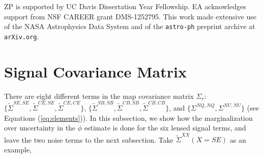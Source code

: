 \documentclass[iop,apj, numberedappendix]{emulateapj}
\begin{document}
\acknowledgements
ZP is supported by UC Davis Dissertation Year Fellowship.
EA acknowledges support from NSF CAREER grant DMS-1252795.
This work made extensive use of the NASA Astrophysics Data System and
of the {\tt astro-ph} preprint archive at {\tt arXiv.org}.




\appendix
\section{Signal Covariance Matrix}
\label{sec:app1}

There are eight different terms in the map covariance matrix $\Sigma_r$:
$\{ \tilde\Sigma^{SE,SE},\tilde\Sigma^{CE,SE},\tilde\Sigma^{CE,CE} \}$,
$\{ \tilde\Sigma^{SB,SB},\tilde\Sigma^{CB,SB},\tilde\Sigma^{CB,CB} \}$,
and $\{ \Sigma^{NQ,NQ},\Sigma^{NU,NU} \}$ (see Equations (\ref{eq:elements})).
In this subsection, we show how the marginalization over uncertainty in the $\phi$ estimate
is done for the six lensed signal terms,
and leave the two noise terms to the next subsection. Take $\tilde\Sigma^{XX} (X = SE)$ as an example,
\end{document}
